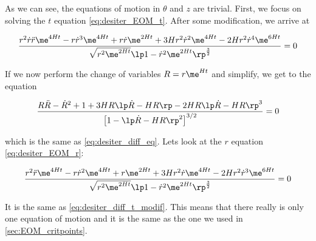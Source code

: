 \noindent
As we can see, the equations of motion in $\theta$ and $z$ are trivial. First, we focus on solving the $t$ equation \eqref{eq:desiter_EOM_t}. After some modification, we arrive at

\begin{equation}
\label{eq:desiter_diff_t_modif}
    \frac{r^2 \dot{r} \ddot{r} \me^{4Ht} - r \dot{r}^3 \me^{4Ht} + r \dot{r} \me^{2Ht} + 3H r^2 \dot{r}^2 \me^{4Ht} - 2H r^2 \dot{r}^4 \me^{6Ht}} {\sqrt{r^2 \me^{2Ht}} \lp 1 - \dot{r}^2 \me^{2Ht} \rp^{\frac{3}{2}}} = 0
\end{equation}

\noindent
If we now perform the change of variables $R = r \me^{Ht}$ and simplify, we get to the equation

\begin{equation}
    \frac{R \ddot{R} - \dot{R}^2 + 1 + 3HR \lp \dot{R} - HR \rp - 2HR \lp \dot{R} - HR \rp^3 }{\left[ 1 - \lp \dot{R} - HR \rp^2 \right]^{3/2}} = 0
\end{equation}

\noindent
which is the same as \cref{eq:desiter_diff_eq}. Lets look at the $r$ equation \eqref{eq:desiter_EOM_r}:

\begin{equation}
    \frac{r^2 \ddot{r} \me^{4Ht} - r \dot{r}^2 \me^{4Ht} + r \me^{2Ht} + 3H r^2 \dot{r} \me^{4Ht} - 2H r^2 \dot{r}^3 \me^{6Ht}} {\sqrt{r^2 \me^{2Ht}} \lp 1 - \dot{r}^2 \me^{2Ht} \rp^{\frac{3}{2}}} = 0
\end{equation}

\noindent
It is the same as \cref{eq:desiter_diff_t_modif}. This means that there really is only one equation of motion and it is the same as the one we used in \cref{sec:EOM_critpoints}.